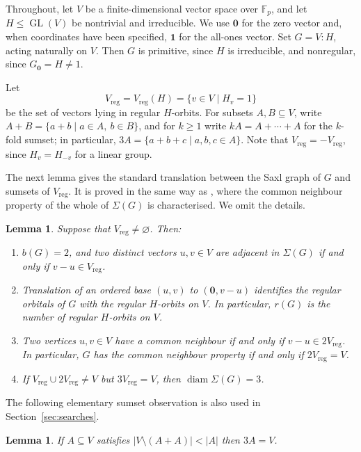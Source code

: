 \documentclass[a4paper,reqno,11pt]{amsart}
\newcommand\F{\mathbb{F}}
\newcommand\GL{\operatorname{GL}}
\newcommand\diam{\operatorname{diam}}
\newtheorem{lem}[thm]{Lemma}
\numberwithin{equation}{section}
\begin{document}
Throughout, let $V$ be a finite-dimensional vector space over $\F_p$, and let $H\le\GL(V)$ be nontrivial and irreducible. We use $\mathbf0$ for the zero vector and, when coordinates have been specified, $\mathbf1$ for the all-ones vector. Set $G=V{:}H$, acting naturally on $V$. Then $G$ is primitive, since $H$ is irreducible, and nonregular, since $G_{\mathbf0}=H\ne1$.

Let
\[
V_{\mathrm{reg}}=V_{\mathrm{reg}}(H)=\{v\in V \mid H_v=1\}
\]
be the set of vectors lying in regular $H$-orbits. For subsets $A,B\subseteq V$, write $A+B=\{a+b \mid a\in A,\ b\in B\}$, and for $k\ge1$ write $kA=A+\cdots+A$ for the $k$-fold sumset; in particular, $3A=\{a+b+c \mid a,b,c\in A\}$. Note that $V_{\mathrm{reg}}=-V_{\mathrm{reg}}$, since $H_v=H_{-v}$ for a linear group.

The next lemma gives the standard translation between the Saxl graph of $G$ and sumsets of $V_{\mathrm{reg}}$. It is proved in the same way as \cite[Lemma~2.3]{LP}, where the common neighbour property of the whole of $\Sigma(G)$ is characterised. We omit the details.


\begin{lem}\label{criterion}
Suppose that $V_{\mathrm{reg}}\ne\varnothing$. Then:
\begin{enumerate}
\item[(i)] $b(G)=2$, and two distinct vectors $u,v\in V$ are adjacent in $\Sigma(G)$ if and only if $v-u\in V_{\mathrm{reg}}$.
\item[(ii)] Translation of an ordered base $(u,v)$ to $(\mathbf0,v-u)$ identifies the regular orbitals of $G$ with the regular $H$-orbits on $V$. In particular, $r(G)$ is the number of regular $H$-orbits on $V$.
\item[(iii)] Two vertices $u,v\in V$ have a common neighbour if and only if $v-u\in2V_{\mathrm{reg}}$. In particular, $G$ has the common neighbour property if and only if $2V_{\mathrm{reg}}=V$.
\item[(iv)] If $V_{\mathrm{reg}}\cup2V_{\mathrm{reg}}\ne V$ but $3V_{\mathrm{reg}}=V$, then $\diam\Sigma(G)=3$.
\end{enumerate}
\end{lem}

The following elementary sumset observation is also used in Section~\ref{sec:searches}.

\begin{lem}\label{triplesum}
If $A\subseteq V$ satisfies $|V\setminus(A+A)|<|A|$ then $3A=V$.
\end{lem}
\end{document}
